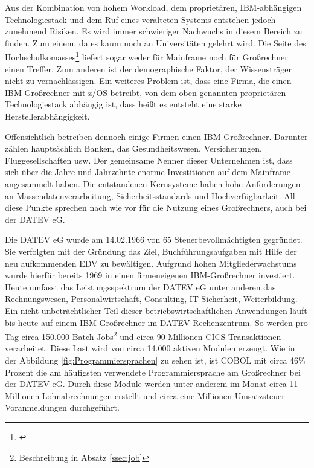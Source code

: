 Aus der Kombination von hohem Workload, dem proprietären, IBM-abhängigen Technologiestack und dem Ruf eines veralteten Systems entstehen jedoch zunehmend Risiken.
Es wird immer schwieriger Nachwuchs in diesem Bereich zu finden.
Zum einem, da es kaum noch an Universitäten gelehrt wird.
Die Seite des Hochschulkomasses\footnote{\cite{internetagenturKolnFrankfurtsunzinetTYPO3Programmmierung.}} liefert sogar weder für \glqq Mainframe\grqq{} noch für \glqq Großrechner\grqq{} einen Treffer.
Zum anderen ist der demographische Faktor, der Wissensträger nicht zu vernachlässigen.
Ein weiteres Problem ist, dass eine Firma, die einen IBM Großrechner mit z/OS betreibt, von dem oben genannten proprietären Technologiestack abhängig ist, dass heißt es entsteht eine starke Herstellerabhängigkeit.

Offensichtlich betreiben dennoch einige Firmen einen IBM Großrechner.
Darunter zählen hauptsächlich Banken, das Gesundheitswesen, Versicherungen, Fluggesellschaften usw.
Der gemeinsame Nenner dieser Unternehmen ist, dass sich über die Jahre und Jahrzehnte enorme Investitionen auf dem Mainframe angesammelt haben.
Die entstandenen Kernsysteme haben hohe Anforderungen an Massendatenverarbeitung, Sicherheitsstandards und Hochverfügbarkeit.
All diese Punkte sprechen nach wie vor für die Nutzung eines Großrechners, auch bei der DATEV eG.
\cite{IBM.2014}

Die DATEV eG wurde am 14.02.1966 von 65 Steuerbevollmächtigten gegründet.
Sie verfolgten mit der Gründung das Ziel, Buchführungsaufgaben mit Hilfe der neu aufkommenden EDV zu bewältigen.
Aufgrund hohen Mitgliederwachstums wurde hierfür bereits 1969 in einen firmeneigenen IBM-Großrechner investiert.\cite{DATEVeG.2017}
Heute umfasst das Leistungsspektrum der DATEV eG unter anderen das Rechnungswesen, Personalwirtschaft, Consulting, IT-Sicherheit, Weiterbildung.
Ein nicht unbeträchtlicher Teil dieser betriebswirtschaftlichen Anwendungen läuft bis heute auf einem IBM Großrechner im DATEV Rechenzentrum.
So werden pro Tag circa 150.000 Batch Jobs\footnote{Beschreibung in Absatz \ref{ssec:job}} und circa 90 Millionen CICS-Transaktionen verarbeitet.
Diese Last wird von circa 14.000 aktiven Modulen erzeugt.
Wie in der Abbildung \ref{fig:Programmiersprachen} zu sehen ist, ist COBOL mit circa 46\% Prozent die am häufigsten verwendete Programmiersprache am Großrechner bei der DATEV eG.
Durch diese Module werden unter anderem im Monat circa 11 Millionen Lohnabrechnungen erstellt und circa eine Millionen Umsatzsteuer-Voranmeldungen durchgeführt.

